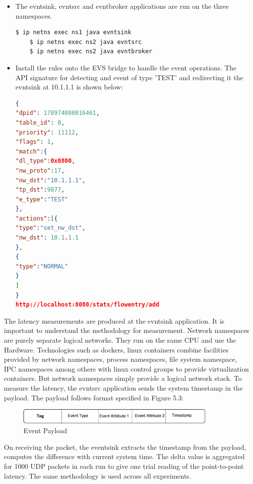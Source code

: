 \begin{itemize}
	\item The evntsink, evntsrc and evntbroker applications are run on the three namespaces.
	\begin{lstlisting}[language=bash]
	$ ip netns exec ns1 java evntsink
	$ ip netns exec ns2 java evntsrc
	$ ip netns exec ns2 java evntbroker \end{lstlisting}
\end{itemize}

\begin{itemize}
	\item Install the rules onto the EVS bridge to handle the event operations. The API signature for detecting and event of type 'TEST' and redirecting it the evntsink at 10.1.1.1 is shown below:
\begin{lstlisting}[language=json,firstnumber=1]
 {
"dpid": 178974088016461,
"table_id": 0,
"priority": 11112,
"flags": 1,
"match":{
"dl_type":0x0800,
"nw_proto":17,
"nw_dst":"10.1.1.1",
"tp_dst":9877,
"e_type":"TEST"
},
"actions":[{
"type":"set_nw_dst",
"nw_dst": 10.1.1.1
},
{
"type":"NORMAL"
}
]
}
http://localhost:8080/stats/flowentry/add \end{lstlisting}
\end{itemize}

The latency measurements are produced at the evntsink application. It is important to understand the methodology for measurement. Network namespaces are purely separate logical networks. They run on the same CPU and use the Hardware. Technologies such as dockers, linux containers combine facilities provided by network namespaces, process namespaces, file system namespace, IPC namespaces among others with linux control groups to provide virtualization containers. But network namespaces simply provide a logical network stack. To measure the latency, the evntsrc application sends the system timestamp in the payload. The payload follows format specified in Figure 5.3:


 \begin{figure}[H]
	\centering
	\caption{Event Payload}
	\includegraphics[width=10cm]{payload.pdf}
\end{figure}

On receiving the packet, the eventsink extracts the timestamp from the payload, computes the difference with current system time. The delta value is aggregated for 1000 UDP packets in each run to give one trial reading of the point-to-point latency. The same methodology is used across all experiments.

